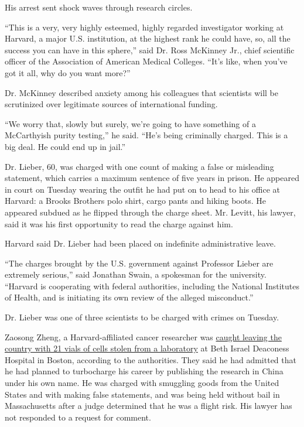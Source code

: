 His arrest sent shock waves through research circles.

``This is a very, very highly esteemed, highly regarded investigator
working at Harvard, a major U.S. institution, at the highest rank he
could have, so, all the success you can have in this sphere,'' said Dr.
Ross McKinney Jr., chief scientific officer of the Association of
American Medical Colleges. ``It's like, when you've got it all, why do
you want more?''

Dr. McKinney described anxiety among his colleagues that scientists will
be scrutinized over legitimate sources of international funding.

``We worry that, slowly but surely, we're going to have something of a
McCarthyish purity testing,'' he said. ``He's being criminally charged.
This is a big deal. He could end up in jail.''

Dr. Lieber, 60, was charged with one count of making a false or
misleading statement, which carries a maximum sentence of five years in
prison. He appeared in court on Tuesday wearing the outfit he had put on
to head to his office at Harvard: a Brooks Brothers polo shirt, cargo
pants and hiking boots. He appeared subdued as he flipped through the
charge sheet. Mr. Levitt, his lawyer, said it was his first opportunity
to read the charge against him.

Harvard said Dr. Lieber had been placed on indefinite administrative
leave.

``The charges brought by the U.S. government against Professor Lieber
are extremely serious,'' said Jonathan Swain, a spokesman for the
university. ``Harvard is cooperating with federal authorities, including
the National Institutes of Health, and is initiating its own review of
the alleged misconduct.''

Dr. Lieber was one of three scientists to be charged with crimes on
Tuesday.

Zaosong Zheng, a Harvard-affiliated cancer researcher was
\href{https://www.nytimes3xbfgragh.onion/2019/12/31/us/chinese-scientist-cancer-research-investigation.html}{caught
leaving the country with 21 vials of cells stolen from a laboratory} at
Beth Israel Deaconess Hospital in Boston, according to the authorities.
They said he had admitted that he had planned to turbocharge his career
by publishing the research in China under his own name. He was charged
with smuggling goods from the United States and with making false
statements, and was being held without bail in Massachusetts after a
judge determined that he was a flight risk. His lawyer has not responded
to a request for comment.

